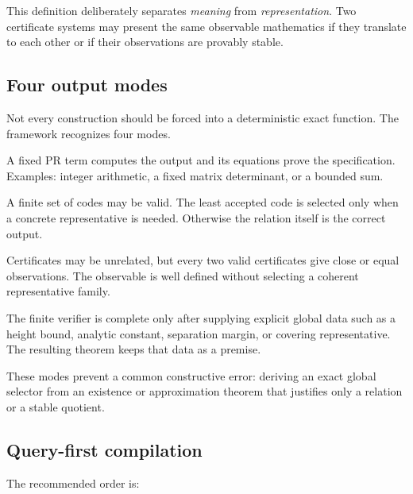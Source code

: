 This definition deliberately separates \emph{meaning} from
\emph{representation}.  Two certificate systems may present the same
observable mathematics if they translate to each other or if their observations
are provably stable.

\subsection{Four output modes}

Not every construction should be forced into a deterministic exact function.
The framework recognizes four modes.

\begin{description}[leftmargin=2.8cm,style=nextline]
\item[Exact deterministic.]
A fixed PR term computes the output and its equations prove the specification.
Examples: integer arithmetic, a fixed matrix determinant, or a bounded sum.

\item[Bounded relational.]
A finite set of codes may be valid.  The least accepted code is selected only
when a concrete representative is needed.  Otherwise the relation itself is
the correct output.

\item[Stable observable.]
Certificates may be unrelated, but every two valid certificates give close or
equal observations.  The observable is well defined without selecting a
coherent representative family.

\item[Conditional.]
The finite verifier is complete only after supplying explicit global data such
as a height bound, analytic constant, separation margin, or covering
representative.  The resulting theorem keeps that data as a premise.
\end{description}

These modes prevent a common constructive error: deriving an exact global
selector from an existence or approximation theorem that justifies only a
relation or a stable quotient.

\subsection{Query-first compilation}

The recommended order is:

